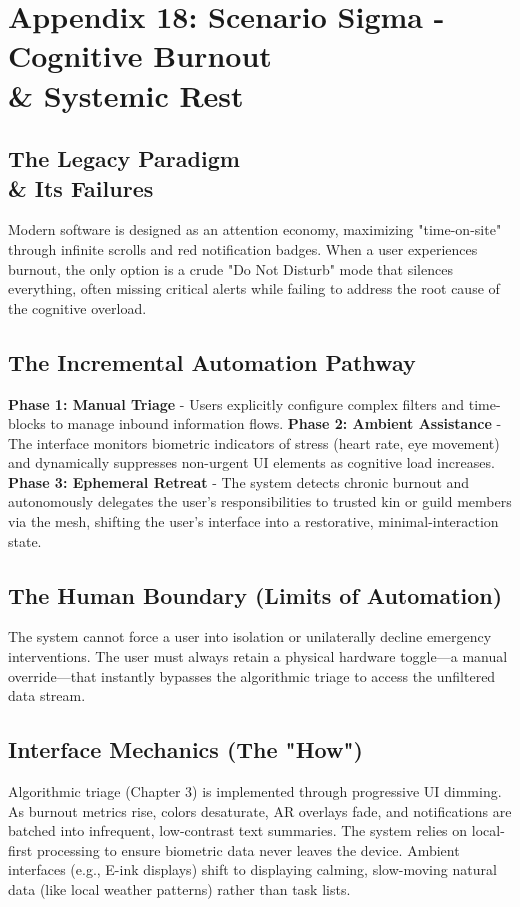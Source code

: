 \section{Appendix 18: Scenario Sigma - Cognitive Burnout \\\& Systemic Rest}

\subsection{The Legacy Paradigm \\\& Its Failures}
Modern software is designed as an attention economy, maximizing "time-on-site" through infinite scrolls and red notification badges. When a user experiences burnout, the only option is a crude "Do Not Disturb" mode that silences everything, often missing critical alerts while failing to address the root cause of the cognitive overload.

\subsection{The Incremental Automation Pathway}
\textbf{Phase 1: Manual Triage} - Users explicitly configure complex filters and time-blocks to manage inbound information flows.
\textbf{Phase 2: Ambient Assistance} - The interface monitors biometric indicators of stress (heart rate, eye movement) and dynamically suppresses non-urgent UI elements as cognitive load increases.
\textbf{Phase 3: Ephemeral Retreat} - The system detects chronic burnout and autonomously delegates the user's responsibilities to trusted kin or guild members via the mesh, shifting the user's interface into a restorative, minimal-interaction state.

\subsection{The Human Boundary (Limits of Automation)}
The system cannot force a user into isolation or unilaterally decline emergency interventions. The user must always retain a physical hardware toggle—a manual override—that instantly bypasses the algorithmic triage to access the unfiltered data stream.

\subsection{Interface Mechanics (The "How")}
Algorithmic triage (Chapter 3) is implemented through progressive UI dimming. As burnout metrics rise, colors desaturate, AR overlays fade, and notifications are batched into infrequent, low-contrast text summaries. The system relies on local-first processing to ensure biometric data never leaves the device. Ambient interfaces (e.g., E-ink displays) shift to displaying calming, slow-moving natural data (like local weather patterns) rather than task lists.


